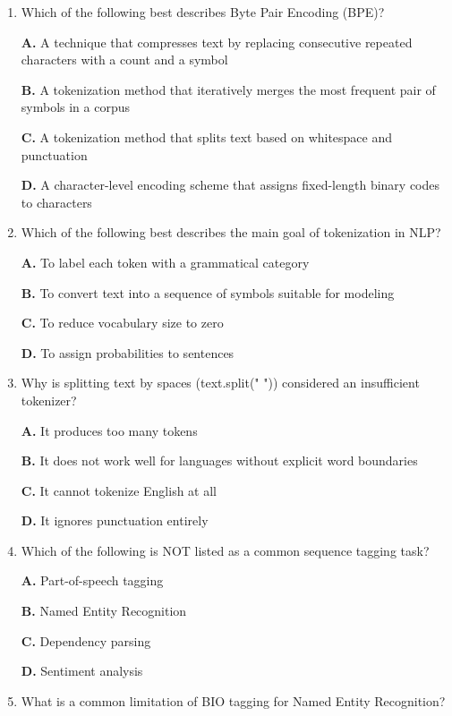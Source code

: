 \documentclass[11pt]{article}
\begin{document}
\begin{enumerate}[label=Q\arabic*., leftmargin=*]
\textbf{C.} A method that classifies named entities and links them to a knowledge base

\textbf{D.} A technique that labels words with their parts of speech and morphological features

\item Which of the following best describes Byte Pair Encoding (BPE)?

\textbf{A.} A technique that compresses text by replacing consecutive repeated characters with a count and a symbol

\textbf{B.} A tokenization method that iteratively merges the most frequent pair of symbols in a corpus

\textbf{C.} A tokenization method that splits text based on whitespace and punctuation

\textbf{D.} A character-level encoding scheme that assigns fixed-length binary codes to characters

\item Which of the following best describes the main goal of tokenization in NLP?

\textbf{A.} To label each token with a grammatical category

\textbf{B.} To convert text into a sequence of symbols suitable for modeling

\textbf{C.} To reduce vocabulary size to zero

\textbf{D.} To assign probabilities to sentences

\item Why is splitting text by spaces (text.split(" ")) considered an insufficient tokenizer?

\textbf{A.} It produces too many tokens

\textbf{B.} It does not work well for languages without explicit word boundaries

\textbf{C.} It cannot tokenize English at all

\textbf{D.} It ignores punctuation entirely

\item Which of the following is NOT listed as a common sequence tagging task?

\textbf{A.} Part-of-speech tagging

\textbf{B.} Named Entity Recognition

\textbf{C.} Dependency parsing

\textbf{D.} Sentiment analysis

\item What is a common limitation of BIO tagging for Named Entity Recognition?


\end{enumerate}
\end{document}
